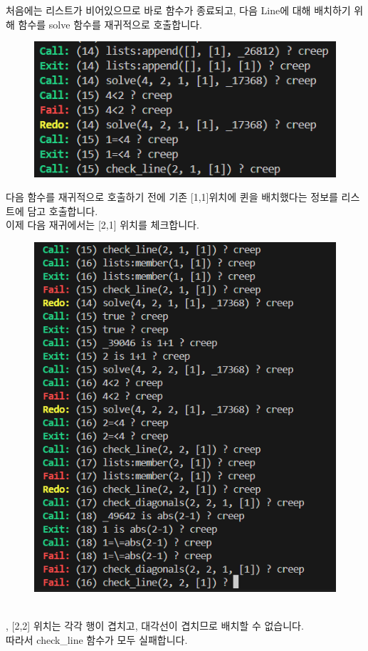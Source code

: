 \documentclass{article}
\begin{document}
처음에는 리스트가 비어있으므로 바로 함수가 종료되고, 다음 Line에 대해 배치하기 위해 함수를 solve 함수를 재귀적으로 호출합니다.\\
\newpage
\begin{figure}[!htb]
    \centering
    \includegraphics[width=0.8\linewidth]{hw5b_4.png}
\end{figure}
다음 함수를 재귀적으로 호출하기 전에 기존 [1,1]위치에 퀸을 배치했다는 정보를 리스트에 담고 호출합니다.\\
이제 다음 재귀에서는 [2,1] 위치를 체크합니다.
\begin{figure}[!htb]
    \centering
    \includegraphics[width=0.8\linewidth]{hw5b_5.png}
\end{figure}\\
\quad [2,1], [2,2] 위치는 각각 행이 겹치고, 대각선이 겹치므로 배치할 수 없습니다.\\
따라서 check\_line 함수가 모두 실패합니다.\\
\end{document}
